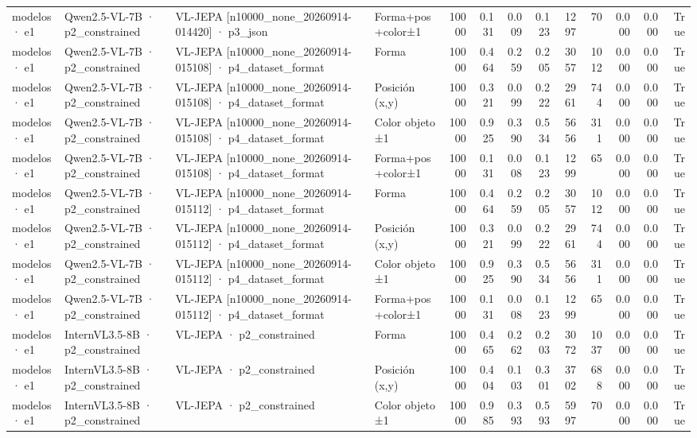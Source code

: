 \begin{tabular}{llllrrrrrrrrr}
modelos · e1 & Qwen2.5-VL-7B · p2\_constrained & VL-JEPA [n10000\_none\_20260914-014420] · p3\_json & Forma+pos+color±1 & 10000 & 0.131 & 0.009 & 0.123 & 1297 & 70 & 0.000 & 0.000 & True \\
modelos · e1 & Qwen2.5-VL-7B · p2\_constrained & VL-JEPA [n10000\_none\_20260914-015108] · p4\_dataset\_format & Forma & 10000 & 0.464 & 0.259 & 0.205 & 3057 & 1012 & 0.000 & 0.000 & True \\
modelos · e1 & Qwen2.5-VL-7B · p2\_constrained & VL-JEPA [n10000\_none\_20260914-015108] · p4\_dataset\_format & Posición (x,y) & 10000 & 0.321 & 0.099 & 0.222 & 2961 & 744 & 0.000 & 0.000 & True \\
modelos · e1 & Qwen2.5-VL-7B · p2\_constrained & VL-JEPA [n10000\_none\_20260914-015108] · p4\_dataset\_format & Color objeto ±1 & 10000 & 0.925 & 0.390 & 0.534 & 5656 & 311 & 0.000 & 0.000 & True \\
modelos · e1 & Qwen2.5-VL-7B · p2\_constrained & VL-JEPA [n10000\_none\_20260914-015108] · p4\_dataset\_format & Forma+pos+color±1 & 10000 & 0.131 & 0.008 & 0.123 & 1299 & 65 & 0.000 & 0.000 & True \\
modelos · e1 & Qwen2.5-VL-7B · p2\_constrained & VL-JEPA [n10000\_none\_20260914-015112] · p4\_dataset\_format & Forma & 10000 & 0.464 & 0.259 & 0.205 & 3057 & 1012 & 0.000 & 0.000 & True \\
modelos · e1 & Qwen2.5-VL-7B · p2\_constrained & VL-JEPA [n10000\_none\_20260914-015112] · p4\_dataset\_format & Posición (x,y) & 10000 & 0.321 & 0.099 & 0.222 & 2961 & 744 & 0.000 & 0.000 & True \\
modelos · e1 & Qwen2.5-VL-7B · p2\_constrained & VL-JEPA [n10000\_none\_20260914-015112] · p4\_dataset\_format & Color objeto ±1 & 10000 & 0.925 & 0.390 & 0.534 & 5656 & 311 & 0.000 & 0.000 & True \\
modelos · e1 & Qwen2.5-VL-7B · p2\_constrained & VL-JEPA [n10000\_none\_20260914-015112] · p4\_dataset\_format & Forma+pos+color±1 & 10000 & 0.131 & 0.008 & 0.123 & 1299 & 65 & 0.000 & 0.000 & True \\
modelos · e1 & InternVL3.5-8B · p2\_constrained & VL-JEPA · p2\_constrained & Forma & 10000 & 0.465 & 0.262 & 0.203 & 3072 & 1037 & 0.000 & 0.000 & True \\
modelos · e1 & InternVL3.5-8B · p2\_constrained & VL-JEPA · p2\_constrained & Posición (x,y) & 10000 & 0.404 & 0.103 & 0.301 & 3702 & 688 & 0.000 & 0.000 & True \\
modelos · e1 & InternVL3.5-8B · p2\_constrained & VL-JEPA · p2\_constrained & Color objeto ±1 & 10000 & 0.985 & 0.393 & 0.593 & 5997 & 70 & 0.000 & 0.000 & True \\

\end{tabular}

